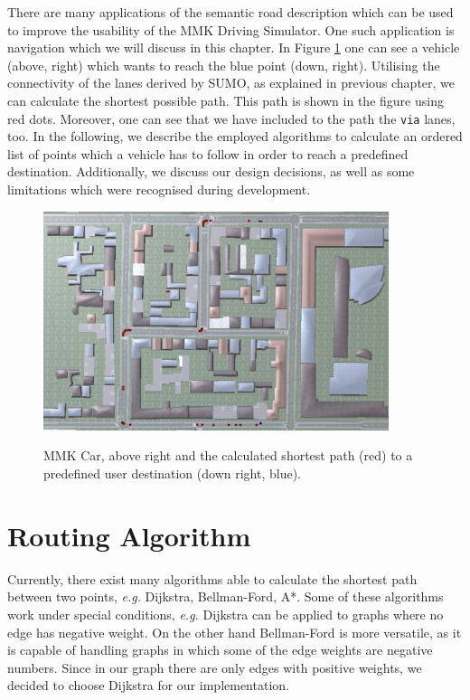 There are many applications of the semantic road description which can be used to improve the usability of the MMK Driving Simulator. One such application is navigation which we will discuss in this chapter. In Figure \ref{fig:nav} one can see a vehicle (above, right) which wants to reach the blue point (down, right). Utilising the connectivity of the lanes derived by SUMO, as explained in previous chapter, we can calculate the shortest possible path. This path is shown in the figure using red dots. Moreover, one can see that we have included to the path the \texttt{via} lanes, too. In the following, we describe the employed algorithms to calculate an ordered list of points which a vehicle has to follow in order to reach a predefined destination. Additionally, we discuss our design decisions, as well as some limitations which were recognised during development.

\begin{figure}[htb]
	\centering
	\includegraphics[width=0.9\textwidth]{figures/nav}
	\label{fig:nav}
	\caption{MMK Car, above right and the calculated shortest path (red) to a predefined user destination (down right, blue).}
\end{figure}
\section{Routing Algorithm}
Currently, there exist many algorithms able to calculate the shortest path between two points, \emph{e.g.} Dijkstra, Bellman-Ford, A*. Some of these algorithms work under special conditions, \emph{e.g.} Dijkstra can be applied to graphs where no edge has negative weight. On the other hand Bellman-Ford is more versatile, as it is capable of handling graphs in which some of the edge weights are negative numbers. Since in our graph there are only edges with positive weights, we decided to choose Dijkstra for our implementation.

